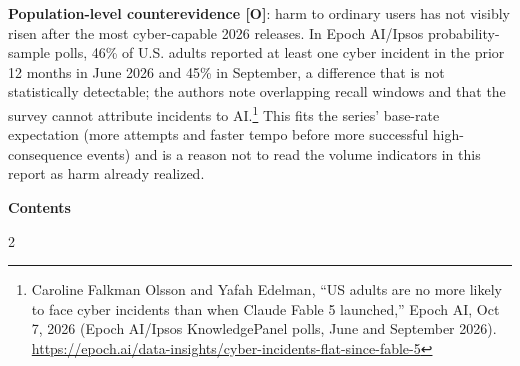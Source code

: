 \documentclass[11pt,letterpaper]{article}
\makeatletter
\newcommand{\etraneed}[1]{\par\if@nobreak\else\penalty\z@\ifdim\pagegoal<\maxdimen\ifdim\dimexpr\pagegoal-\pagetotal\relax<\dimexpr#1\relax\newpage\fi\fi\fi}
\newcommand{\inlinetoc}{\@starttoc{toc}}
\makeatother
\begin{document}
\textbf{Population-level counterevidence [O]}: harm to ordinary users has not visibly risen after the most cyber-capable 2026 releases. In Epoch AI/Ipsos probability-sample polls, 46\% of U.S. adults reported at least one cyber incident in the prior 12 months in June 2026 and 45\% in September, a difference that is not statistically detectable; the authors note overlapping recall windows and that the survey cannot attribute incidents to AI.\footnote{Caroline Falkman Olsson and Yafah Edelman, ``US adults are no more likely to face cyber incidents than when Claude Fable 5 launched,'' Epoch AI, Oct 7, 2026 (Epoch AI/Ipsos KnowledgePanel polls, June and September 2026). \url{https://epoch.ai/data-insights/cyber-incidents-flat-since-fable-5}} This fits the series' base-rate expectation (more attempts and faster tempo before more successful high-consequence events) and is a reason not to read the volume indicators in this report as harm already realized.


\etraneed{14\baselineskip}
\vspace{0.6cm}
\begin{center}
{\color{slatedark}\Large\bfseries Contents}
\end{center}
\vspace{0.1cm}
\begin{tcolorbox}[enhanced, colback=lightgray, colframe=slatemid!40, boxrule=0.8pt, arc=3pt, left=10pt, right=10pt, top=8pt, bottom=8pt]
\small
\begin{multicols}{2}
\inlinetoc
\end{multicols}
\end{tcolorbox}
\newpage
\end{document}
